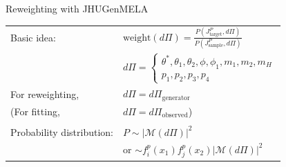 \documentclass[usenames,dvipsnames,svgnames,table]{beamer}
\begin{document}
\begin{frame}{Reweighting with JHUGenMELA}
\begin{tabular}{ll}
Basic idea: & $\text{weight}\left(d\Pi\right)=\frac{P(J^P_\text{target},d\Pi)}{P(J^P_\text{sample},d\Pi)}$ \\
& $d\Pi = \begin{cases} \theta^*, \theta_1, \theta_2, \phi, \phi_1, m_1, m_2, m_H \\ p_1, p_2, p_3, p_4 \end{cases}$ \\
For reweighting, & $d\Pi = d\Pi_\text{generator}$ \\
(For fitting, & $d\Pi = d\Pi_\text{observed}$) \\
& \\
Probability distribution: & $P\sim\left|\mathcal{M}\left(d\Pi\right)\right|^2$ \\
 & or $\sim f^p_i\left(x_1\right)f^p_j(x_2)\left|\mathcal{M}\left(d\Pi\right)\right|^2$

\end{tabular}
\end{frame}
\end{document}
